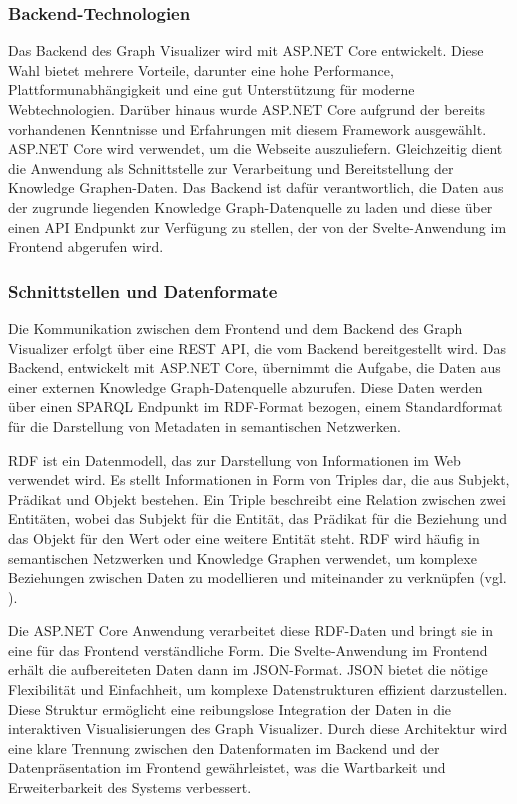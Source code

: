 \subsubsection{Backend-Technologien}

Das Backend des Graph Visualizer wird mit ASP.NET Core entwickelt. Diese Wahl bietet mehrere Vorteile, darunter eine hohe Performance, Plattformunabhängigkeit und eine gut Unterstützung für moderne Webtechnologien. Darüber hinaus wurde ASP.NET Core aufgrund der bereits vorhandenen Kenntnisse und Erfahrungen mit diesem Framework ausgewählt. ASP.NET Core wird verwendet, um die Webseite auszuliefern. Gleichzeitig dient die Anwendung als Schnittstelle zur Verarbeitung und Bereitstellung der Knowledge Graphen-Daten. Das Backend ist dafür verantwortlich, die Daten aus der zugrunde liegenden Knowledge Graph-Datenquelle zu laden und diese über einen \ac{API} Endpunkt zur Verfügung zu stellen, der von der Svelte-Anwendung im Frontend abgerufen wird.

\subsubsection{Schnittstellen und Datenformate}

Die Kommunikation zwischen dem Frontend und dem Backend des Graph Visualizer erfolgt über eine REST \ac{API}, die vom Backend bereitgestellt wird. Das Backend, entwickelt mit ASP.NET Core, übernimmt die Aufgabe, die Daten aus einer externen Knowledge Graph-Datenquelle abzurufen. Diese Daten werden über einen \ac{SPARQL} Endpunkt im \acs{RDF}-Format bezogen, einem Standardformat für die Darstellung von Metadaten in semantischen Netzwerken.

\ac{RDF} ist ein Datenmodell, das zur Darstellung von Informationen im Web verwendet wird. Es stellt Informationen in Form von Triples dar, die aus Subjekt, Prädikat und Objekt bestehen. Ein Triple beschreibt eine Relation zwischen zwei Entitäten, wobei das Subjekt für die Entität, das Prädikat für die Beziehung und das Objekt für den Wert oder eine weitere Entität steht. \ac{RDF} wird häufig in semantischen Netzwerken und Knowledge Graphen verwendet, um komplexe Beziehungen zwischen Daten zu modellieren und miteinander zu verknüpfen (vgl. \cite{rdf:W3C}).

Die ASP.NET Core Anwendung verarbeitet diese \ac{RDF}-Daten und bringt sie in eine für das Frontend verständliche Form. Die Svelte-Anwendung im Frontend erhält die aufbereiteten Daten dann im \ac{JSON}-Format. \ac{JSON} bietet die nötige Flexibilität und Einfachheit, um komplexe Datenstrukturen effizient darzustellen. Diese Struktur ermöglicht eine reibungslose Integration der Daten in die interaktiven Visualisierungen des Graph Visualizer. Durch diese Architektur wird eine klare Trennung zwischen den Datenformaten im Backend und der Datenpräsentation im Frontend gewährleistet, was die Wartbarkeit und Erweiterbarkeit des Systems verbessert.

